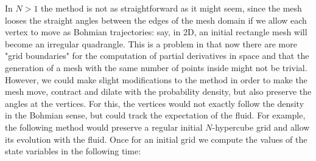 \documentclass[11pt, a4paper]{article} %
\begin{document}
In $N>1$ the method is not as straightforward as it might seem, since the mesh looses the straight angles between the edges of the mesh domain if we allow each vertex to move as Bohmian trajectories: say, in 2D, an initial rectangle mesh will become an irregular quadrangle. This is a problem in that now there are more "grid boundaries" for the computation of partial derivatives in space and that the generation of a mesh with the same number of points inside might not be trivial. However, we could make slight modifications to the method in order to make the mesh move, contract and dilate with the probability density, but also preserve the angles at the vertices. For this, the vertices would not exactly follow the density in the Bohmian sense, but could track the expectation of the fluid. For example, the following method would preserve a regular initial $N$-hypercube grid and allow its evolution with the fluid. Once for an initial grid we compute the values of the state variables in the following time:\vspace{-0.2cm}
\end{document}
